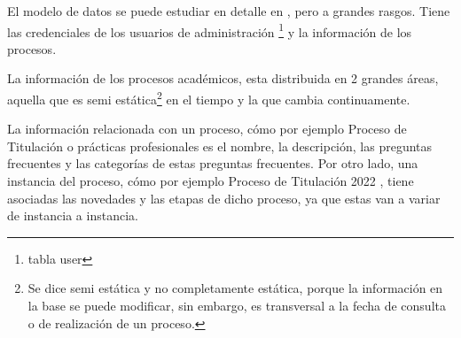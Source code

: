         \par El modelo de datos se puede estudiar en detalle en \cite{ARANCIBIA2021}, pero a grandes rasgos. Tiene las credenciales de los usuarios de administración \footnote{tabla user} y la información de los procesos.
        \par La información de los procesos académicos, esta distribuida en 2 grandes áreas, aquella que es semi estática\footnote{Se dice semi estática y no completamente estática, porque la información en la base se puede modificar, sin embargo, es transversal a la fecha de consulta o de realización de un proceso.} en el tiempo y la que cambia continuamente. 
        \par La información relacionada con un proceso, cómo por ejemplo \guillemotleft Proceso de Titulación \guillemotright o \guillemotleft prácticas profesionales \guillemotright es el nombre, la descripción, las preguntas frecuentes y las categorías de estas preguntas frecuentes. Por otro lado, una instancia del proceso, cómo por ejemplo  \guillemotleft Proceso de Titulación 2022 \guillemotright, tiene asociadas las novedades y las etapas de dicho proceso, ya que estas van a variar de instancia a instancia.

